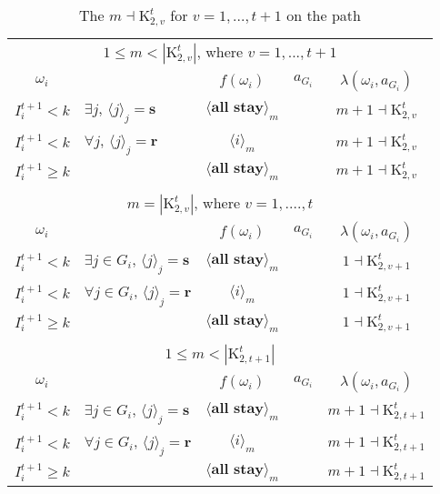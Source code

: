 \documentclass[12pt,letter]{article}
\newcommand{\Kappa}{\mathrm{K}}
\theoremstyle{definition}
\theoremstyle{remark}
\theoremstyle{claim}
\begin{document}
\begin{table}[!htbp]
\caption{The $m\dashv\Kappa^t_{2,v}$ for $v=1,...,t+1$ on the path}
\label{table:eqm_path_kt2}
\begin{center}
\begin{tabular}{c l | c | c | c}
\multicolumn{5}{c}{$1\leq m < |\Kappa^t_{2,v}|$, where $v=1,...,t+1$}\\
$\omega_i$ 	 & 	   &	$f(\omega_i)$  &	$a_{G_i}$ & $\lambda(\omega_i,a_{G_i})$ \\
\hline
\hline
$I^{t+1}_i< k$  	& 	$\exists j$, $\langle j \rangle_j=\textbf{s}$	& $\langle \textbf{all stay} \rangle_m$		&  	& $m+1\dashv \Kappa^t_{2,v}$\\
$I^{t+1}_i< k$  	& 	$\forall j$, $\langle j \rangle_j=\textbf{r}$	& $\langle i \rangle_m$		&  	& $m+1\dashv \Kappa^t_{2,v}$\\
$I^{t+1}_i\geq k$	 & 				& $\langle \textbf{all stay} \rangle_m$ 	& 		& $m+1\dashv \Kappa^t_{2,v}$\\
\hline
\\
\multicolumn{5}{c}{$m= |\Kappa^t_{2,v}|$, where $v=1,....,t$}\\
$\omega_i$ 	 & 	   &	$f(\omega_i)$  &	$a_{G_i}$ & $\lambda(\omega_i,a_{G_i})$ \\
\hline
\hline
$I^{t+1}_i< k$  	& 	$\exists j\in G_i$, $\langle j \rangle_j=\textbf{s}$	& $\langle \textbf{all stay} \rangle_m$		&  	& $1\dashv \Kappa^t_{2,v+1}$\\
$I^{t+1}_i< k$  	& 	$\forall j\in G_i$, $\langle j \rangle_j=\textbf{r}$	& $\langle i \rangle_m$		&  	& $1\dashv \Kappa^t_{2,v+1}$\\
$I^{t+1}_i\geq k$	 & 				& $\langle \textbf{all stay} \rangle_m$ 	& 		& $1\dashv \Kappa^t_{2,v+1}$\\
\hline
\\
\multicolumn{5}{c}{$1\leq m < |\Kappa^t_{2,t+1}|$}\\
$\omega_i$ 	 & 	   &	$f(\omega_i)$  &	$a_{G_i}$ & $\lambda(\omega_i,a_{G_i})$ \\
\hline
\hline
$I^{t+1}_i< k$  	& 	$\exists j\in G_i$, $\langle j \rangle_j=\textbf{s}$	& $\langle \textbf{all stay} \rangle_m$		&  	& $m+1\dashv \Kappa^t_{2,t+1}$\\
$I^{t+1}_i< k$  	& 	$\forall j\in G_i$, $\langle j \rangle_j=\textbf{r}$	& $\langle i \rangle_m$		&  	& $m+1\dashv \Kappa^t_{2,t+1}$\\
$I^{t+1}_i\geq k$	 & 				& $\langle \textbf{all stay} \rangle_m$ 	& 		& $m+1\dashv \Kappa^t_{2,t+1}$\\
\hline

\end{tabular}
\end{center}
\end{table}
\end{document}
